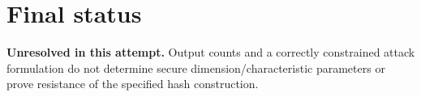 \documentclass[11pt]{article}
\begin{document}
\section{Final status}
\textbf{Unresolved in this attempt.} Output counts and a correctly constrained attack formulation do not determine secure dimension/characteristic parameters or prove resistance of the specified hash construction.
\end{document}
